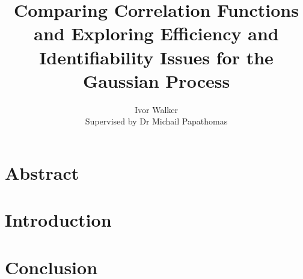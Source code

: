 \documentclass[10pt]{article}
\begin{document}
\title{Comparing Correlation Functions and Exploring Efficiency and Identifiability Issues for the Gaussian Process}
\author{
    Ivor Walker \\
    Supervised by Dr Michail Papathomas \\
}
\date{ }
\maketitle



\section*{Abstract}


\newpage
\tableofcontents
\newpage

\section{Introduction}






\section{Conclusion}




\printbibliography
\end{document}
